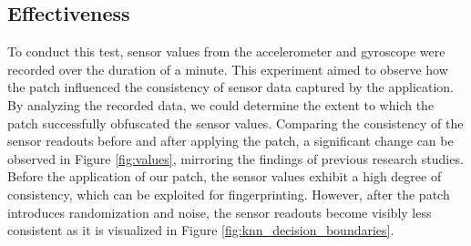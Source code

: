 \documentclass[11pt,
  oneside,openany,    %
]{scrreprt}
\begin{document}
\subsection{Effectiveness}
\label{subsec:effectiveness}
To conduct this test, sensor values from the accelerometer and gyroscope were recorded over the duration of a minute.
This experiment aimed to observe how the patch influenced the consistency of sensor data captured by the application.
By analyzing the recorded data, we could determine the extent to which the patch successfully obfuscated the sensor values.
Comparing the consistency of the sensor readouts before and after applying the patch, a significant change can be observed in Figure \ref{fig:values}, mirroring the findings of previous research studies. 
Before the application of our patch, the sensor values exhibit a high degree of consistency, which can be exploited for fingerprinting.
However, after the patch introduces randomization and noise, the sensor readouts become visibly less consistent as it is visualized in Figure \ref{fig:knn_decision_boundaries}.
\end{document}
